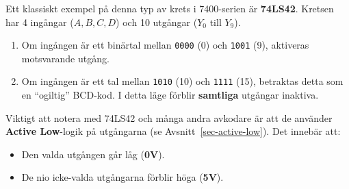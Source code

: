 \documentclass[
  swedish,
  letterpaper,
  oneside,
  openany]{book}
\providecommand{\tightlist}{%
  \setlength{\itemsep}{0pt}\setlength{\parskip}{0pt}}
\begin{document}
Ett klassiskt exempel på denna typ av krets i 7400-serien är
\textbf{74LS42}. Kretsen har 4 ingångar (\(A, B, C, D\)) och 10 utgångar
(\(Y_0\) till \(Y_9\)).

\begin{enumerate}
\def\labelenumi{\arabic{enumi}.}
\tightlist
\item
  Om ingången är ett binärtal mellan \texttt{0000} (0) och \texttt{1001}
  (9), aktiveras motsvarande utgång.
\item
  Om ingången är ett tal mellan \texttt{1010} (10) och \texttt{1111}
  (15), betraktas detta som en ``ogiltig'' BCD-kod. I detta läge förblir
  \textbf{samtliga} utgångar inaktiva.
\end{enumerate}

Viktigt att notera med 74LS42 och många andra avkodare är att de
använder \textbf{Active Low}-logik på utgångarna (se
Avsnitt~\ref{sec-active-low}). Det innebär att:

\begin{itemize}
\tightlist
\item
  Den valda utgången går låg (\textbf{0V}).
\item
  De nio icke-valda utgångarna förblir höga (\textbf{5V}).
\end{itemize}
\end{document}

